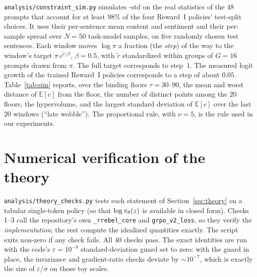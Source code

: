 \texttt{analysis/constraint\_sim.py} simulates \rrebel{}-std on the real
statistics of the $48$ prompts that account for at least $98\%$ of the four
Reward~I policies' test-split choices. It uses their per-sentence mean content
and sentiment and their per-sample spread over $N=50$ task-model samples, on
five randomly chosen test sentences. Each window moves $\log\pi$ a
fraction (the \emph{step}) of the way to the window's target
$\pi\,e^{\tilde r/\beta}$, $\beta = 0.5$, with $\tilde r$ standardized within
groups of $G = 16$ prompts drawn from $\pi$. The full target corresponds to
step~$1$. The measured logit growth of the trained Reward~I policies
corresponds to a step of about $0.05$. Table~\ref{tab:sim} reports, over the
binding floors $\tau = 30$--$90$, the mean and worst distance of
$\mathbb{E}[c]$ from the floor, the number of distinct points among the $20$
floors, the hypervolume, and the largest standard deviation of $\mathbb{E}[c]$
over the last $20$ windows (``late wobble''). The proportional rule, with
$\nu = 5$, is the rule used in our experiments.

\begin{table}[h]
\centering
\small
\resizebox{\textwidth}{!}{}
\caption{Multiplier rules for the expectation floor, simulated on the real
prompt statistics. The exact projection overshoots to the copy prompt, and dual
ascent keeps oscillating. The proportional (quadratic-penalty) multiplier tracks
the floor closely at both step sizes.}
\label{tab:sim}
\end{table}

\section{Numerical verification of the theory}
\label{app:checks}

\texttt{analysis/theory\_checks.py} tests each statement of
Section~\ref{sec:theory} on a tabular single-token policy (so that
$\log\pi_\theta(z)$ is available in closed form). Checks 1--3 call the repository's
own \texttt{\_rrebel\_core} and \texttt{grpo\_v2\_loss}, so they verify the
\emph{implementation}; the rest compute the idealized quantities exactly. The
script exits non-zero if any check fails. All $40$ checks pass. The exact
identities are run with the code's $\varepsilon = 10^{-8}$ standard-deviation
guard set to zero: with the guard in place, the invariance and gradient-ratio
checks deviate by $\sim\!10^{-7}$, which is exactly the size of $\varepsilon/\sigma$
on those toy scales.

